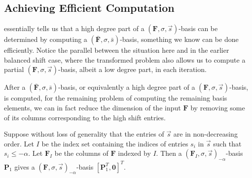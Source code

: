 \subsection{Achieving Efficient Computation}

 essentially tells us that
a high degree part of a $\left(\mathbf{F},\sigma,\vec{s}\right)$-basis
can be determined by computing a $\left(\bar{\mathbf{F}},\sigma,\bar{s}\right)$-basis,
something we know can be done efficiently. Notice the parallel between
the situation here and in the earlier balanced shift case, where the
transformed problem also allows us to compute a partial $\left(\mathbf{F},\sigma,\vec{s}\right)$-basis,
albeit a low degree part, in each iteration.

After a $\left(\bar{\mathbf{F}},\sigma,\bar{s}\right)$-basis, or
equivalently a high degree part of a $\left(\mathbf{F},\sigma,\vec{s}\right)$-basis,
is computed, for the remaining problem of computing the remaining
basis elements, we can in fact reduce the dimension of the input $\mathbf{F}$
by removing some of its columns corresponding to the high shift entries. 
\begin{thm}
\label{thm:zeroHighShiftEntries}Suppose without loss of generality
that the entries of $\vec{s}$ are in non-decreasing order. Let $I$
be the index set containing the indices of entries $s_{i}$ in $\vec{s}$
such that $s_{i}\le-\alpha$. Let $\mathbf{F}_{I}$ be the columns
of $\mathbf{F}$ indexed by $I$. Then a $\left(\mathbf{F}_{I},\sigma,\vec{s}\right)_{-\alpha}$-basis
\textbf{$\mathbf{P}_{1}$} gives a $\left(\mathbf{F},\sigma,\vec{s}\right)_{-\alpha}$-basis
$\left[\mathbf{P}_{1}^{T},\mathbf{0}\right]^{T}$. 
\end{thm}

